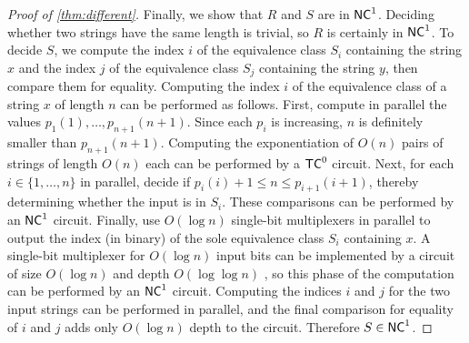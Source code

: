 \begin{proof}[Proof of \autoref{thm:different}]
  Finally, we show that $R$ and $S$ are in ${\mathsf{NC}}^1$.
  Deciding whether two strings have the same length is trivial, so $R$ is certainly in ${\mathsf{NC}}^1$.
  To decide $S$, we compute the index $i$ of the equivalence class $S_i$ containing the string $x$ and the index $j$ of the equivalence class $S_j$ containing the string $y$, then compare them for equality.
  Computing the index $i$ of the equivalence class of a string $x$ of length $n$ can be performed as follows.
  First, compute in parallel the values $p_1(1), \dotsc, p_{n + 1}(n + 1)$.
  Since each $p_i$ is increasing, $n$ is definitely smaller than $p_{n + 1}(n + 1)$.
  Computing the exponentiation of $O(n)$ pairs of strings of length $O(n)$ each can be performed by a ${\mathsf{TC}}^0$ circuit.
  Next, for each $i \in \{1, \dotsc, n\}$ in parallel, decide if $p_i(i) + 1 \leq n \leq p_{i + 1}(i + 1)$, thereby determining whether the input is in $S_i$.
  These comparisons can be performed by an ${\mathsf{NC}}^1$ circuit.
  Finally, use $O(\log n)$ single-bit multiplexers in parallel to output the index (in binary) of the sole equivalence class $S_i$ containing $x$.
  A single-bit multiplexer for $O(\log n)$ input bits can be implemented by a circuit of size $O(\log n)$ and depth $O(\log \log n)$ \autocite[Lemma~2.5.5]{savage98}, so this phase of the computation can be performed by an ${\mathsf{NC}}^1$ circuit.
  Computing the indices $i$ and $j$ for the two input strings can be performed in parallel, and the final comparison for equality of $i$ and $j$ adds only $O(\log n)$ depth to the circuit.
  Therefore $S \in {\ensuremath{\mathsf{NC}}}^1$.
\end{proof}

